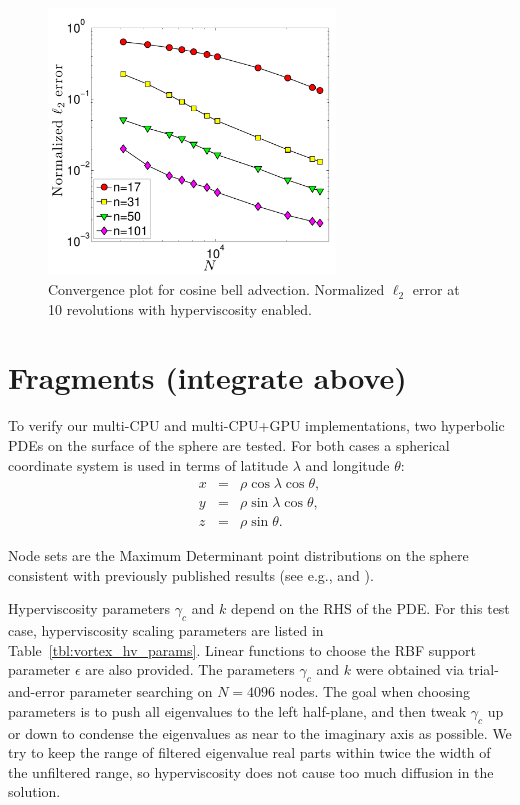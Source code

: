 \documentclass{report}
\begin{document}
\begin{figure}[htbp]
\begin{center}
\includegraphics[width=3in]{../figures/paper1/cosine_bell/convergence_plot_hv-eps-converted-to.pdf}
\caption{Convergence plot for cosine bell advection. Normalized $\ell_2$ error at 10 revolutions with hyperviscosity enabled. }
\label{fig:conv_cosine_bell}
\end{center}
\end{figure}



\section{Fragments (integrate above)}
To verify our multi-CPU and multi-CPU+GPU implementations, two hyperbolic PDEs on the surface of the sphere are tested. For both cases a spherical coordinate system is used in terms of latitude $\lambda$ and longitude $\theta$:
\begin{eqnarray*} 
x & = & \rho \cos \lambda \cos \theta, 	\\
y & = & \rho \sin \lambda \cos \theta, 		\\
z & = & \rho \sin \theta.		
\end{eqnarray*}

Node sets are the Maximum Determinant point distributions on the sphere \cite{Sloan2003} consistent with previously published results (see e.g., \cite{Flyer2007} and \cite{Fornberg2011b}).

Hyperviscosity parameters $\gamma_c$ and $k$ depend on the RHS of the PDE. 
For this test case, hyperviscosity scaling parameters are listed in Table~\ref{tbl:vortex_hv_params}. Linear functions to choose the RBF support parameter $\epsilon$ are also provided. The parameters $\gamma_c$ and $k$ were obtained via trial-and-error parameter searching on $N=4096$ nodes. The goal when choosing parameters is to push all eigenvalues to the left half-plane, and then tweak $\gamma_c$ up or down to condense the eigenvalues as near to the imaginary axis as possible. We try to keep the range of filtered eigenvalue real parts within twice the width of the unfiltered range, so hyperviscosity does not cause too much diffusion in the solution. 
\end{document}
